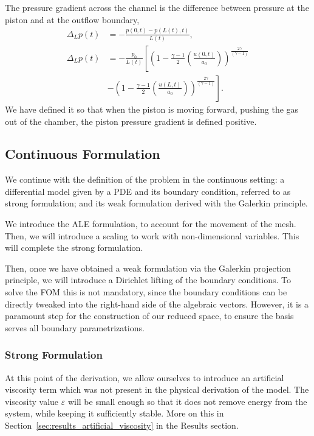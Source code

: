 \documentclass[../../thesis.tex]{subfiles}
\newcommand{\pexp}{\ensuremath{\frac{2\gamma}{\left(\gamma-1\right)}}}
\begin{document}
The pressure gradient across the channel is the difference between pressure at the piston and at the outflow boundary,
\begin{subequations}
    \begin{align}
        \Delta_L p(t) &= - \frac{p(0,t) - p(L(t),t)}{L(t)},
        \label{eq:channel_pressure_gradient} 
        \\ 
        \Delta_L p(t) &= 
        - \frac{p_0}{L(t)} 
        \left[
            \left(1 - \frac{\gamma-1}{2}\left(\frac{u(0,t)}{a_0}\right)\right)^{\pexp}
        \right.
        \\ 
        & - 
        \left.
            \left(1 - \frac{\gamma-1}{2}\left(\frac{u(L,t)}{a_0}\right)\right)^{\pexp}
        \right]
        . \nonumber
    \end{align}
\end{subequations}
We have defined it so that when the piston is moving forward, pushing the gas out of the chamber, the piston pressure gradient is defined positive.

\subsection{Continuous Formulation}
We continue with the definition of the problem in the continuous setting: 
a differential model given by a PDE and its boundary condition, referred to as {strong formulation}; 
and its weak formulation derived with the Galerkin principle.

We introduce the ALE formulation, to account for the movement of the mesh.
Then, we will introduce a scaling to work with non-dimensional variables.
This will complete the strong formulation.

Then, once we have obtained a weak formulation via the Galerkin projection principle,
we will introduce a Dirichlet lifting of the boundary conditions.
To solve the FOM this is not mandatory, since the boundary conditions can be 
directly tweaked into the right-hand side of the algebraic vectors.
However, it is a paramount step for the construction of our reduced space,
to ensure the basis serves all boundary parametrizations.

\subsubsection{Strong Formulation}
At this point of the derivation, we allow ourselves to introduce an artificial viscosity term which was not present in the physical derivation of the model.
The viscosity value $\varepsilon$ will be small enough so that it does not remove energy from the system,
while keeping it sufficiently stable. 
More on this in Section~\ref{sec:results_artificial_viscosity} in the Results section.
\end{document}
